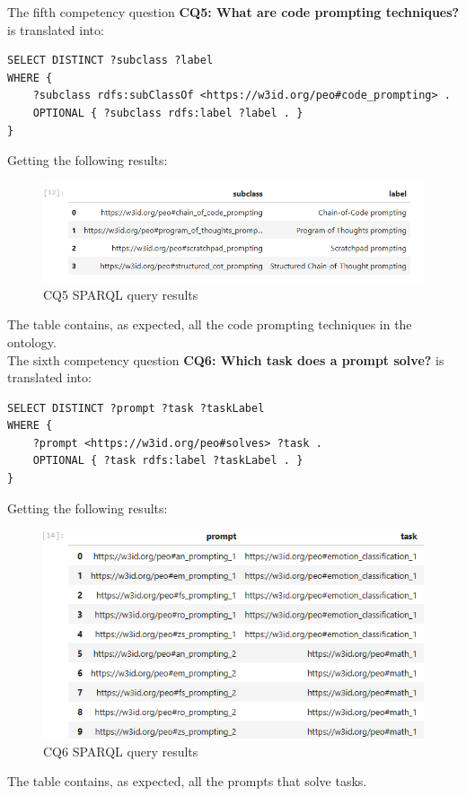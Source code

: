 The fifth competency question \textbf{CQ5: What are code prompting techniques?} is translated into:
\begin{lstlisting}
SELECT DISTINCT ?subclass ?label
WHERE {
    ?subclass rdfs:subClassOf <https://w3id.org/peo#code_prompting> .
    OPTIONAL { ?subclass rdfs:label ?label . }
}  
\end{lstlisting}
Getting the following results:
\begin{figure}[H]
    \centering
    \includegraphics[width=0.9\linewidth]{Figures/fig_51.png}
    \caption{CQ5 SPARQL query results}
    \label{fig:enter-label}
\end{figure}
The table contains, as expected, all the code prompting techniques in the ontology.\\

The sixth competency question \textbf{CQ6: Which task does a prompt solve?} is translated into:
\begin{lstlisting}
SELECT DISTINCT ?prompt ?task ?taskLabel
WHERE {
    ?prompt <https://w3id.org/peo#solves> ?task .
    OPTIONAL { ?task rdfs:label ?taskLabel . }
}
\end{lstlisting}
Getting the following results:
\begin{figure}[H]
    \centering
    \includegraphics[width=0.9\linewidth]{Figures/fig_52.png}
    \caption{CQ6 SPARQL query results}
    \label{fig:enter-label}
\end{figure}
The table contains, as expected, all the prompts that solve tasks.\\

